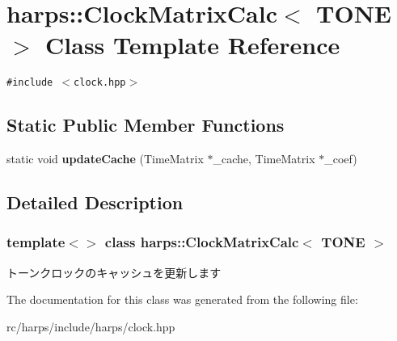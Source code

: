 \section{harps::ClockMatrixCalc$<$ TONE $>$ Class Template Reference}
\label{classharps_1_1ClockMatrixCalc_3_01TONE_01_4}
{\tt \#include $<$clock.hpp$>$}

\subsection*{Static Public Member Functions}
\begin{CompactItemize}
\item 
static void \textbf{updateCache} (TimeMatrix $\ast$\_\-cache, TimeMatrix $\ast$\_\-coef)\label{classharps_1_1ClockMatrixCalc_3_01TONE_01_4_1cf69a43c67340a4dace57cf6e15a7e4}

\end{CompactItemize}


\subsection{Detailed Description}
\subsubsection*{template$<$$>$ class harps::ClockMatrixCalc$<$ TONE $>$}

トーンクロックのキャッシュを更新します 

The documentation for this class was generated from the following file:\begin{CompactItemize}
\item 
rc/harps/include/harps/clock.hpp\end{CompactItemize}
